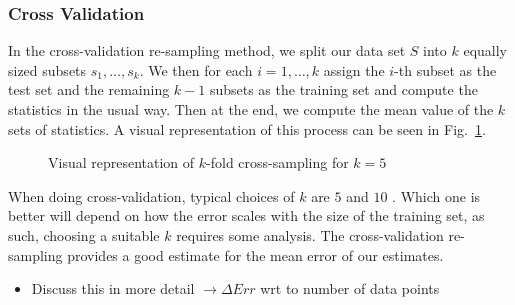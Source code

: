 \documentclass[reprint, english, nofootinbib]{revtex4-2}
\begin{document}
        \subsubsection{Cross Validation}
            \noindent
            In the cross-validation re-sampling method, we split our data set $S$ into $k$ equally sized subsets $s_1, \dots, s_k$.
            We then for each $i = 1,\dots, k$ assign the $i$-th subset as the test set and the remaining $k-1$ subsets as the training set and compute the statistics in the usual way. Then at the end, we compute the mean value of the $k$ sets of statistics. A visual representation of this process can be seen in Fig.~\ref{fig: Cross Validation}.
            \begin{figure}[h!tb]
                \center
                \vspace{5mm} %
                
                \caption{\label{fig: Cross Validation}Visual representation of $k$-fold cross-sampling for $k=5$}
            \end{figure}
            When doing cross-validation, typical choices of $k$ are $5$ and $10$ \cite{hastie}. Which one is better will depend on how the error scales with the size of the training set, as such, choosing a suitable $k$ requires some analysis.
            The cross-validation re-sampling provides a good estimate for the mean error of our estimates.
            \begin{itemize}
                \item Discuss this in more detail $\rightarrow\Delta Err$ wrt to number of data points
            \end{itemize}
            
            
\end{document}
